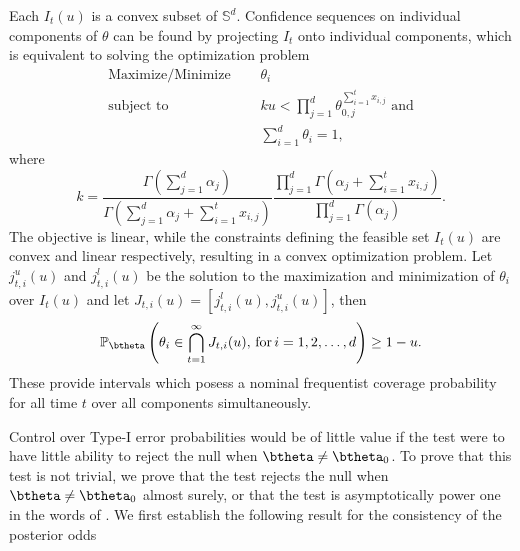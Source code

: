 \documentclass[11pt]{article}
\begin{document}
\noindent Each $I_t(u)$ is a convex subset of $\mathbb{S}^d$.
Confidence sequences on individual components of $\theta$ can be found by projecting $I_t$ onto individual components, which is equivalent to solving the optimization problem
\begin{align*}
  \text{Maximize/Minimize } & \quad \theta_i \\
  \text{subject to } & \quad ku < \prod_{j=1}^{d} \theta_{0,j}^{\sum_{i=1}^{t}x_{i,j}} \text{ and}\\
  &\quad \sum_{i=1}^{d}\theta_i = 1,
\end{align*}
where
\[
  k = \frac{\Gamma(\sum_{j=1}^{d} \alpha_j)}
  {\Gamma(\sum_{j=1}^{d} \alpha_j + \sum_{i=1}^{t}x_{i,j})}
  \frac{\prod_{j=1}^{d}\Gamma(\alpha_j + \sum_{i=1}^{t}x_{i,j} )}
  {\prod_{j=1}^{d}\Gamma(\alpha_j )}.
  \]
The objective is linear, while the constraints defining the feasible set $I_t(u)$ are convex and linear respectively, resulting in a convex optimization problem.
Let $j^{u}_{t,i}(u)$ and $j^{l}_{t,i}(u)$ be the solution to the maximization and minimization of $\theta_i$ over $I_t(u)$ and let $J_{t,i}(u)=[j^{l}_{t,i}(u), j^{u}_{t,i}(u)]$, then
\begin{equation}
  \label{eq:marginal_confidence_sequence}
  \mathbb{P}_{\btheta}\left( \theta_i \in \bigcap_{t=1}^{\infty} J_{t,i}(u),\, \text{for}\, i = 1,2, \dots, d \right) \geq 1- u.
\end{equation}
These provide intervals which posess a nominal frequentist coverage probability for all time $t$ over all components simultaneously.

Control over Type-I error probabilities would be of little value if the test were to have little ability to reject the null when $\btheta \neq \btheta_0$.
To prove that this test is not trivial, we prove that the test rejects the null when $\btheta \neq \btheta_0$ almost surely, or that the test is asymptotically power one in the words of \cite{robbins}.
We first establish the following result for the consistency of the posterior odds
\end{document}
